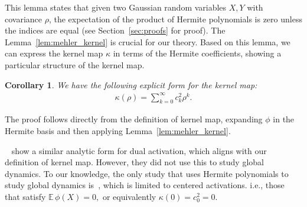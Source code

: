 \documentclass[twoside]{article}
\newcommand{\E}{\mathbb{E}\,}
\newtheorem{corollary}{Corollary}
\theoremstyle{definition}
\newcommand{\thomas}[1]{{\color{blue}\textit{#1}}}
\begin{document}
This lemma states that given two Gaussian random variables $X, Y$ with covariance $\rho$, the expectation of the product of Hermite polynomials is zero unless the indices are equal (see Section~\ref{sec:proofs} for proof).
The Lemma~\ref{lem:mehler_kernel} is crucial for our theory. Based on this lemma, we can express the kernel map $\kappa$ in terms of the Hermite coefficients, showing a particular structure of the kernel map.

\begin{corollary}
    \label{cor:hermite_covariance}
    \label{cor:kernel_map}
We have the following explicit form for the kernel map:
\begin{align*}
\kappa(\rho) = \sum_{k=0}^\infty c_k^2 \rho^k.
\end{align*}
\end{corollary}


The proof follows directly from the definition of kernel map, expanding $\phi$ in the Hermite basis and then applying Lemma~\ref{lem:mehler_kernel}. 

~\citet{daniely2016toward} show a similar analytic form for dual activation, which aligns with our definition of kernel map. However, they did not use this to study global dynamics. To our knowledge, the only study that uses Hermite polynomials to study global dynamics is~\citep{joudaki2023impact}, which is limited to centered activations. i.e., those that satisfy $\E \phi(X)=0,$ or equivalently $\kappa(0)=c_0^2 = 0.$


\end{document}
